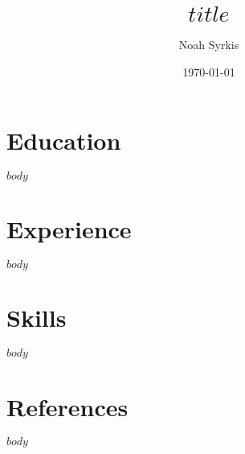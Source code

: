 \documentclass[12pt]{article}
\title{$title$}
\author{Noah Syrkis}
\date{\today}
\begin{document}
\maketitle

\section*{Education}
$body$

\section*{Experience}
$body$

\section*{Skills}
$body$

\section*{References}
$body$
\end{document}
